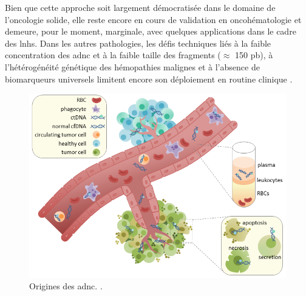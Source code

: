 Bien que cette approche soit largement démocratisée dans le domaine de l'oncologie solide, elle reste encore en cours de validation en oncohématologie et demeure,
pour le moment, marginale, avec quelques applications dans le cadre des \glspl{lnh}. Dans les autres pathologies, les défis techniques liés à la faible concentration des 
\gls{adnc} et à la faible taille des fragments ($\approx$ 150 pb), à l'hétérogénéité génétique des hémopathies malignes et à l'absence de biomarqueurs universels 
limitent encore son déploiement en routine clinique \cite{daoUsingCfDNACtDNA2023}.

\begin{figure}[H]
    \includegraphics[width=1\textwidth]{images/ctdna.png}
    \caption{Origines des \gls{adnc}. \citeauthor{racheljunewongEnglishCirculatingTumor2017} \cite{racheljunewongEnglishCirculatingTumor2017}.}
    \label{fig:ctdna}
\end{figure}
    
